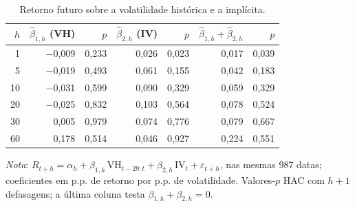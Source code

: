\begin{table}[H]
\centering
\small
\caption{Retorno futuro sobre a volatilidade histórica e a implícita.}
\label{tab:retlin-componentes}
\begin{tabular}{rrrrrrr}
\toprule
$h$ & $\hat\beta_{1,h}$ (VH) & $p$ & $\hat\beta_{2,h}$ (IV) & $p$ & $\hat\beta_{1,h} + \hat\beta_{2,h}$ & $p$ \\
\midrule
1 & $-$0{,}009 & 0{,}233 & 0{,}026 & 0{,}023 & 0{,}017 & 0{,}039 \\
5 & $-$0{,}019 & 0{,}493 & 0{,}061 & 0{,}155 & 0{,}042 & 0{,}183 \\
10 & $-$0{,}031 & 0{,}599 & 0{,}090 & 0{,}329 & 0{,}059 & 0{,}329 \\
20 & $-$0{,}025 & 0{,}832 & 0{,}103 & 0{,}564 & 0{,}078 & 0{,}524 \\
30 & 0{,}005 & 0{,}979 & 0{,}074 & 0{,}776 & 0{,}079 & 0{,}667 \\
60 & 0{,}178 & 0{,}514 & 0{,}046 & 0{,}927 & 0{,}224 & 0{,}551 \\
\bottomrule
\end{tabular}
\par\smallskip
\parbox{0.95\linewidth}{\footnotesize\textit{Nota}: $R_{t+h} = \alpha_h + \beta_{1,h}\,\text{VH}_{t-29:t} + \beta_{2,h}\,\text{IV}_t + \varepsilon_{t+h}$, nas mesmas 987 datas; coeficientes em p.p. de retorno por p.p. de volatilidade. Valores-$p$ HAC com $h+1$ defasagens; a última coluna testa $\beta_{1,h} + \beta_{2,h} = 0$.}
\end{table}

